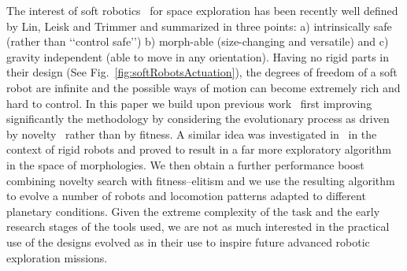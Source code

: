 \documentclass{sig-alternate}
\begin{document}
The interest of soft robotics~\cite{trivedi2008soft, pfeifer2012challenges} for space exploration has been recently well defined by Lin, Leisk and Trimmer \cite{softrobotsinspace} and summarized in three points: a) intrinsically safe (rather than \lq\lq control safe\rq\rq) b) morph-able (size-changing and versatile) and c) gravity independent (able to move in any orientation).  Having no rigid parts in their design (See Fig.~\ref{fig:softRobotsActuation}), the degrees of freedom of a soft robot are infinite and the possible ways of motion can become extremely rich and hard to control. 
In this paper we build upon previous work~\cite{cheney2013unshackling} first improving significantly the methodology by considering the evolutionary process as driven by novelty~\cite{lehman2008exploiting,lehman2011abandoning,lehman2010revising, risi2009novelty} rather than by fitness. A similar idea was investigated in~\cite{lehman2011evolving} in the context of rigid robots and proved to result in a far more exploratory algorithm in the space of morphologies. We then obtain a further performance boost combining novelty search with fitness--elitism and we use the resulting algorithm to evolve a number of robots and locomotion patterns adapted to different planetary conditions. Given the extreme complexity of the task and the early research stages of the tools used, we are not as much interested in the practical use of the designs evolved as in their use to inspire future advanced robotic exploration missions.
\end{document}
